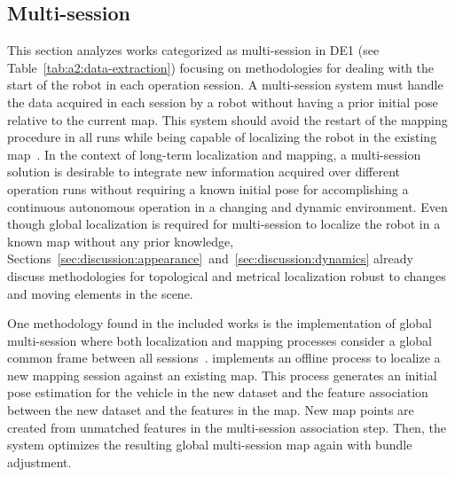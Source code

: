 \subsection{Multi-session}
\label{sec:discussion:multisession}

This section analyzes works categorized as multi-session in DE1 (see Table~\ref{tab:a2:data-extraction}) focusing on methodologies for dealing with the start of the robot in each operation session. A multi-session system must handle the data acquired in each session by a robot without having a prior initial pose relative to the current map. This system should avoid the restart of the mapping procedure in all runs while being capable of localizing the robot in the existing map~\parencite{labbé-michaud:2019:21831}.
In the context of long-term localization and mapping, a multi-session solution is desirable to integrate new information acquired over different operation runs without requiring a known initial pose for accomplishing a continuous autonomous operation in a changing and dynamic environment.
Even though global localization is required for multi-session to localize the robot in a known map without any prior knowledge, Sections~\ref{sec:discussion:appearance}~and~\ref{sec:discussion:dynamics} already discuss methodologies for topological and metrical localization robust to changes and moving elements in the scene.

One methodology found in the included works is the implementation of global multi-session where both localization and mapping processes consider a global common frame between all sessions~\parencite{ozog-et-al:2016:21582}.
\cite{bürki-et-al:2019:21870} implements an offline process to localize a new mapping session against an existing map. This process generates an initial pose estimation for the vehicle in the new dataset and the feature association between the new dataset and the features in the map. New map points are created from unmatched features in the multi-session association step. Then, the system optimizes the resulting global multi-session map again with bundle adjustment.

